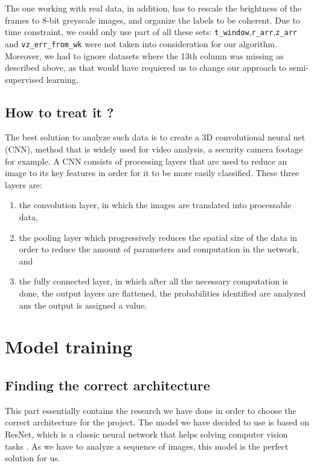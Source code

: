 \documentclass[10pt,conference]{IEEEtran}
\begin{document}
The one working with real data, in addition, has to rescale the brightness of the frames to 8-bit greyscale images, and organize the labels to be coherent.
Due to time constraint, we could only use part of all these sets: \texttt{t\_window},\texttt{r\_arr},\texttt{z\_arr} and \texttt{vz\_err\_from\_wk} were not taken into consideration for our algorithm. Moreover, we had to ignore datasets where the 13th column was missing as described above, as that would have requiered us to change our approach to semi-supervised learning.


\subsection{How to treat it ?}
The best solution to analyze such data is to create a 3D convolutional neural net (CNN), method that is widely used for video analysis, a security camera footage for example. A CNN consists of processing layers that are used to reduce an image to its key features in order for it to be more easily classified. These three layers are:
\begin{enumerate}
  \item the convolution layer, in which the images are translated into processable data,
  \item the pooling layer which progressively reduces the spatial size of the data in order to reduce the amount of parameters and computation in the network, and
  \item the fully connected layer, in which after all the necessary computation is done, the output layers are flattened, the probabilities identified are analyzed ans the output is assigned a value.
\end{enumerate}

\section{Model training}
\subsection{Finding the correct architecture}
This part essentially contains the research we have done in order to choose the correct architecture for the project. The model we have decided to use is based on ResNet, which is a classic neural network that helps solving computer vision tasks \cite{hara3dcnns}. As we have to analyze a sequence of images, this model is the perfect solution for us.
\end{document}
